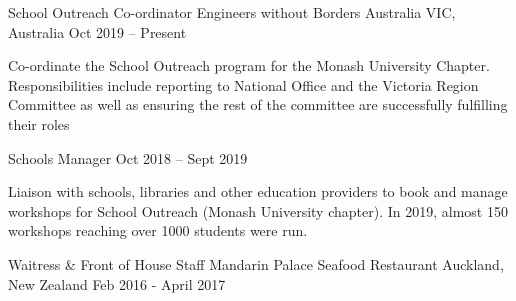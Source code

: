 \begin{cventries}
  \cventry
    {School Outreach Co-ordinator} %
    {Engineers without Borders Australia} %
    {VIC, Australia} %
    {Oct 2019 – Present} %
    {
      \begin{cvitems} %
        \item {Co-ordinate the School Outreach program for the Monash University Chapter. Responsibilities include reporting to National Office and the Victoria Region Committee as well as ensuring the rest of the committee are successfully fulfilling their roles}
      \end{cvitems}
    }
    \vspace*{-0.5mm}
    \cventry
    {Schools Manager} %
    {} %
    {} %
    {Oct 2018 – Sept 2019} %
    {
      \begin{cvitems} %
        \item {Liaison with schools, libraries and other education providers to book and manage workshops for School Outreach (Monash University chapter). In 2019, almost 150 workshops reaching over 1000 students were run.}
      \end{cvitems}
    }


  \cventry
    {Waitress \& Front of House Staff} %
    {Mandarin Palace Seafood Restaurant} %
    {Auckland, New Zealand} %
    {Feb 2016 - April 2017} %
    {
      \begin{cvitems} 
      \end{cvitems}
    }


\end{cventries}
